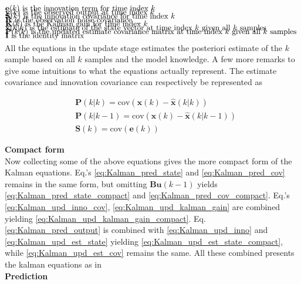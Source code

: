\begin{align*}
	&\text{$\textbf{e}		(k)$ 		is the innovation term for time index 					$ k $													}	\\[-1em]
	&\text{$\textbf{y}		(k)$ 		is the observed output at time index 					$ k $													}	\\[-1em]
	&\text{$\textbf{S}		(k)$ 		is the innovation covariance for time index 			$ k $											}	\\[-1em]
	&\text{$\textbf{R}$ 				is the observation noise covariance																}	\\[-1em]
	&\text{$\textbf{K}		(k)$ 		is the Kalman gain for time index 						$ k $													}	\\[-1em]
	&\text{$\hat{\textbf{x}}(k|k)$ 	is the estimate of the state vector at time index 			$ k $ given all 	$ k$ samples	}	\\[-1em]
	&\text{$\textbf{P}		(k|k)$ 	is the updated estimate covariance matrix at time index 	$ k $ given all 	$ k$ samples		}	\\[-1em]
	&\text{$\textbf{I}$ 				is the identity matrix																				}	\\[-1em]			
\end{align*}

All the equations in the update stage estimates the posteriori estimate of the $ k $ sample based on all $ k $ samples and the model knowledge. A few more remarks to give some intuitions to what the equations actually represent. The estimate covariance and innovation covariance can respectively be represented as 

\begin{align}
	&\textbf{P}(k|k) 	= \text{cov}(\textbf{x}(k)-	\hat{\textbf{x}}(k|k))	\\
	&\textbf{P}(k|k-1) 	= \text{cov}(\textbf{x}(k)-	\hat{\textbf{x}}(k|k-1)) 		\\
	&\textbf{S}(k) 		= \text{cov}(\textbf{e}(k)) 
\end{align}

\textbf{Compact form}\\
Now collecting some of the above equations gives the more compact form of the Kalman equations.
Eq.'s \ref{eq:Kalman_pred_state} and \ref{eq:Kalman_pred_cov} remains in the same form, but omitting $ \textbf{Bu}(k-1) $ yields \cref{eq:Kalman_pred_state_compact} and \cref{eq:Kalman_pred_cov_compact}. Eq.'s \ref{eq:Kalman_upd_inno_cov}, \ref{eq:Kalman_upd_kalman_gain} are combined yielding \cref{eq:Kalman_upd_kalman_gain_compact}. Eq. \ref{eq:Kalman_pred_output} is combined with \cref{eq:Kalman_upd_inno} and \cref{eq:Kalman_upd_est_state} yielding \cref{eq:Kalman_upd_est_state_compact}, while \cref{eq:Kalman_upd_est_cov} remains the same. All these combined presents the kalman equations as in \cite{Bozic1994}\\
\textbf{Prediction}

